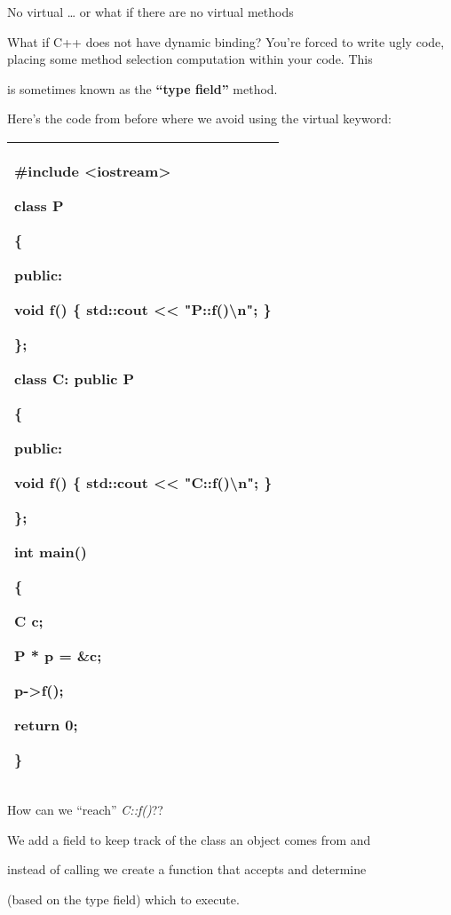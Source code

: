 \documentclass[
]{article}
\begin{document}
No virtual \ldots{} or what if there are no virtual methods

What if C++ does not have dynamic binding? You're forced to write ugly
code, placing some method selection computation within your code. This

is sometimes known as the \textbf{``type field''} method.

Here's the code from before where we avoid using the virtual keyword:

\begin{longtable}[]{@{}l@{}}
\toprule
\endhead
\begin{minipage}[t]{0.97\columnwidth}\raggedright
\#include \textless iostream\textgreater{}

class P

\{

public:

void f() \{ std::cout \textless\textless{} "P::f()\textbackslash n"; \}

\};

class C: public P

\{

public:

void f() \{ std::cout \textless\textless{} "C::f()\textbackslash n"; \}

\};

int main()

\{

C c;

P * p = \&c;

p-\textgreater f();

return 0;

\}\strut
\end{minipage}\tabularnewline
\bottomrule
\end{longtable}

How can we ``reach'' \emph{C::f()}??

We add a field to keep track of the class an object comes from and

instead of calling we create a function that accepts and determine

(based on the type field) which to execute.
\end{document}
